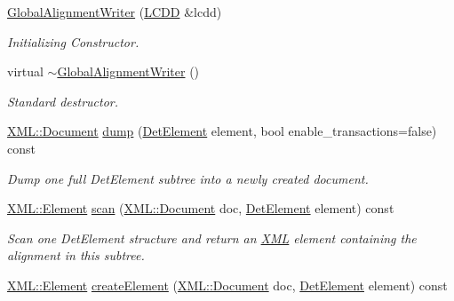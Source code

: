 \begin{DoxyCompactItemize}
\item 
\hyperlink{class_d_d4hep_1_1_alignments_1_1_global_alignment_writer_a11a20b65cc5391ee6b6f77cb38fb5703}{Global\+Alignment\+Writer} (\hyperlink{class_d_d4hep_1_1_geometry_1_1_l_c_d_d}{L\+C\+DD} \&lcdd)
\begin{DoxyCompactList}\small\item\em Initializing Constructor. \end{DoxyCompactList}\item 
virtual \hyperlink{class_d_d4hep_1_1_alignments_1_1_global_alignment_writer_ac88d52ba1f9f66cd93b65b9464c9fd92}{$\sim$\+Global\+Alignment\+Writer} ()
\begin{DoxyCompactList}\small\item\em Standard destructor. \end{DoxyCompactList}\item 
\hyperlink{class_d_d4hep_1_1_x_m_l_1_1_document}{X\+M\+L\+::\+Document} \hyperlink{class_d_d4hep_1_1_alignments_1_1_global_alignment_writer_a27eb3fbd7ac13d4190a3b24b7071c10c}{dump} (\hyperlink{class_d_d4hep_1_1_geometry_1_1_det_element}{Det\+Element} element, bool enable\+\_\+transactions=false) const
\begin{DoxyCompactList}\small\item\em Dump one full Det\+Element subtree into a newly created document. \end{DoxyCompactList}\item 
\hyperlink{class_d_d4hep_1_1_x_m_l_1_1_element}{X\+M\+L\+::\+Element} \hyperlink{class_d_d4hep_1_1_alignments_1_1_global_alignment_writer_a4b4a9fab094b77d01d0d50ae0960ec8f}{scan} (\hyperlink{class_d_d4hep_1_1_x_m_l_1_1_document}{X\+M\+L\+::\+Document} doc, \hyperlink{class_d_d4hep_1_1_geometry_1_1_det_element}{Det\+Element} element) const
\begin{DoxyCompactList}\small\item\em Scan one Det\+Element structure and return an \hyperlink{namespace_d_d4hep_1_1_x_m_l}{X\+ML} element containing the alignment in this subtree. \end{DoxyCompactList}\item 
\hyperlink{class_d_d4hep_1_1_x_m_l_1_1_element}{X\+M\+L\+::\+Element} \hyperlink{class_d_d4hep_1_1_alignments_1_1_global_alignment_writer_a1c6a08c54de9ea8fb16b1e534209513f}{create\+Element} (\hyperlink{class_d_d4hep_1_1_x_m_l_1_1_document}{X\+M\+L\+::\+Document} doc, \hyperlink{class_d_d4hep_1_1_geometry_1_1_det_element}{Det\+Element} element) const

\end{DoxyCompactItemize}
